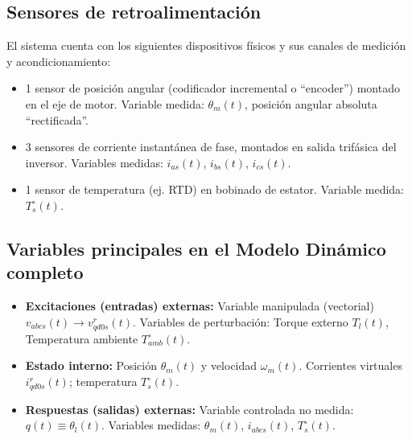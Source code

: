 \documentclass[11pt,a4paper]{article}
\begin{document}
\subsection*{Sensores de retroalimentación}
El sistema cuenta con los siguientes dispositivos físicos y sus canales de medición y acondicionamiento:
\begin{itemize}
    \item 1 sensor de posición angular (codificador incremental o ``encoder'') montado en el eje de motor. Variable medida: $\theta_m(t)$, posición angular absoluta ``rectificada''.
    \item 3 sensores de corriente instantánea de fase, montados en salida trifásica del inversor. Variables medidas: $i_{as}(t)$, $i_{bs}(t)$, $i_{cs}(t)$.
    \item 1 sensor de temperatura (ej. RTD) en bobinado de estator. Variable medida: $T_s^\circ(t)$.
\end{itemize}

\subsection*{Variables principales en el Modelo Dinámico completo}
\begin{itemize}
    \item \textbf{Excitaciones (entradas) externas:} Variable manipulada (vectorial) $v_{abcs}(t) \rightarrow v_{qd0s}^r(t)$. Variables de perturbación: Torque externo $T_l(t)$, Temperatura ambiente $T_{amb}^\circ(t)$.
    \item \textbf{Estado interno:} Posición $\theta_m(t)$ y velocidad $\omega_m(t)$. Corrientes virtuales $i_{qd0s}^r(t)$; temperatura $T_s^\circ(t)$.
    \item \textbf{Respuestas (salidas) externas:} Variable controlada no medida: $q(t) \equiv \theta_l(t)$. Variables medidas: $\theta_m(t)$, $i_{abcs}(t)$, $T_s^\circ(t)$.
\end{itemize}

\end{document}
